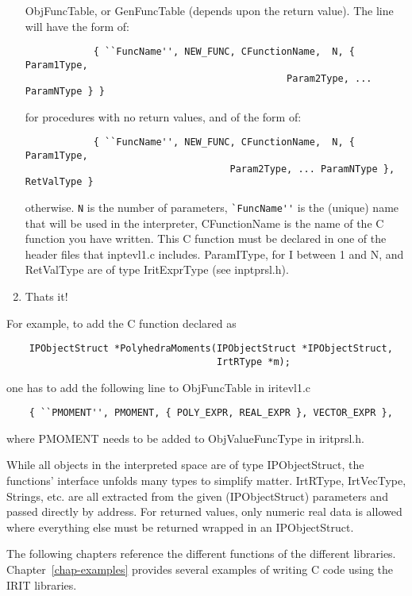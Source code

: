 \begin{enumerate}
	ObjFuncTable, or GenFuncTable (depends upon the return value).
	The line will have the form of:
	\begin{verbatim}
            { ``FuncName'', NEW_FUNC, CFunctionName,  N, { Param1Type,
                                              Param2Type, ... ParamNType } }
	\end{verbatim}
	for procedures with no return values, and of the form of:
	\begin{verbatim}
            { ``FuncName'', NEW_FUNC, CFunctionName,  N, { Param1Type,
                                    Param2Type, ... ParamNType }, RetValType }
	\end{verbatim}
	otherwise. \verb-N- is the number of parameters,
	\verb-`FuncName''- is the (unique) name that will be used in
	the interpreter, CFunctionName is the name of the C function you
	have written. This C function must be declared in one of the header
	files that inptevl1.c includes. ParamIType, for I between 1 and N,
	and RetValType are of type IritExprType (see inptprsl.h).
\item Thats it!
\end{enumerate}

For example, to add the C function declared as
\begin{verbatim}
    IPObjectStruct *PolyhedraMoments(IPObjectStruct *IPObjectStruct,
                                     IrtRType *m);
\end{verbatim}
one has to add the following line to ObjFuncTable in iritevl1.c
\begin{verbatim}
    { ``PMOMENT'', PMOMENT, { POLY_EXPR, REAL_EXPR }, VECTOR_EXPR },
\end{verbatim}
where PMOMENT needs to be added to ObjValueFuncType in iritprsl.h.

While all objects in the interpreted space are of type IPObjectStruct,
the functions' interface unfolds many types to simplify matter.
IrtRType, IrtVecType, Strings, etc. are all extracted from the given
(IPObjectStruct) parameters and passed directly by address.  For
returned values, only numeric real data is allowed where everything
else must be returned wrapped in an IPObjectStruct.


The following chapters reference the different functions of the different
libraries. Chapter~\ref{chap-examples} provides several examples of
writing C code using the IRIT libraries.


